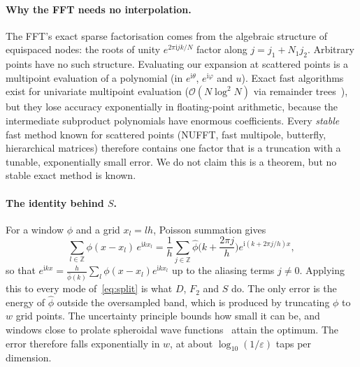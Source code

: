 \documentclass[11pt,a4paper]{article}
\theoremstyle{remark}
\newcommand{\eps}{\varepsilon}
\newcommand{\Oh}{\mathcal{O}}
\begin{document}
\paragraph{Why the FFT needs no interpolation.} The FFT's exact sparse factorisation comes from the
algebraic structure of equispaced nodes: the roots of unity $e^{2\pi\mathrm ijk/N}$ factor along
$j=j_1+N_1j_2$. Arbitrary points have no such structure. Evaluating our expansion at scattered points is a
multipoint evaluation of a polynomial (in $e^{\mathrm i\theta}$, $e^{\mathrm i\varphi}$ and $u$). Exact fast algorithms exist for
univariate multipoint evaluation ($\Oh(N\log^2N)$ via remainder trees~\cite{borodin1974}), but they lose accuracy
exponentially in floating-point arithmetic, because the intermediate subproduct polynomials have enormous
coefficients. Every \emph{stable} fast method known for scattered points (NUFFT, fast multipole, butterfly,
hierarchical matrices) therefore contains one factor that is a truncation with a tunable, exponentially small error.
We do not claim this is a theorem, but no stable exact method is known.

\paragraph{The identity behind $S$.} For a window $\phi$ and a grid $x_l=lh$, Poisson summation gives
\begin{equation}\label{eq:poisson}
\sum_{l\in\mathbb Z}\phi(x-x_l)\,e^{\mathrm ikx_l}
=\frac1h\sum_{j\in\mathbb Z}\hat\phi\Big(k+\frac{2\pi j}h\Big)e^{\mathrm i(k+2\pi j/h)x},
\end{equation}
so that
$e^{\mathrm ikx}=\frac{h}{\hat\phi(k)}\sum_l\phi(x-x_l)e^{\mathrm ikx_l}$ up to the aliasing terms $j\ne0$. Applying this
to every mode of~\eqref{eq:split} is what $D$, $F_2$ and $S$ do. The only error is the energy of $\hat\phi$
outside the oversampled band, which is produced by truncating $\phi$ to $w$ grid points. The uncertainty principle
bounds how small it can be, and windows close to prolate spheroidal wave functions~\cite{slepian1961} attain the
optimum. The error therefore falls exponentially in $w$, at about $\log_{10}(1/\eps)$ taps per dimension.
\end{document}
